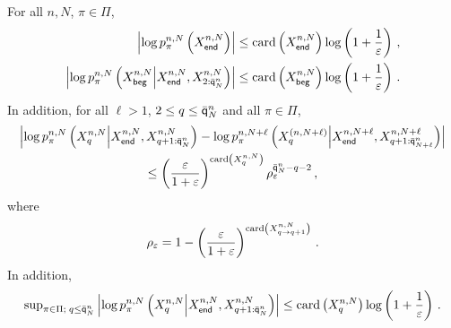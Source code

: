\begin{lemma}
\label{lem:exp:forget}
For all $n,N$, $\pi\in\Pi$,
\begin{align}
\left|\log p_{\pi}^{n,N}\left(X_{\mathsf{end}}^{n,N}\right)\right|&\le \mathrm{card}\left(X_{\mathsf{end}}^{n,N}\right)\log \left(1+\frac{1}{\varepsilon}\right)\,,\label{eq:bound:beg}\\
\left|\log p_{\pi}^{n,N}\left(X_{\mathsf{beg}}^{n,N}\middle|X_{\mathsf{end}}^{n,N},X_{2:\bar{\mathsf{q}}^{n}_{N}}^{n,N}\right)\right|&\le \mathrm{card}\left(X_{\mathsf{beg}}^{n,N}\right)\log \left(1+\frac{1}{\varepsilon}\right)\label{eq:bound:end}\,.
\end{align}
In addition,  for all $\ell>1$,  $2\le q\le \bar{\mathsf{q}}^{n}_{N}$ and all $\pi\in\Pi$,
\begin{multline}
\left|\log p_{\pi}^{n,N}\left(X_{q}^{n,N}\middle|X_{\mathsf{end}}^{n,N},X_{q+1:\bar{\mathsf{q}}^{n}_{N}}^{n,N}\right) - \log p_{\pi}^{n,N+\ell}\left(X_{q}^{(n,N+\ell)}\middle|X_{\mathsf{end}}^{n,N+\ell},X_{q+1:\bar{\mathsf{q}}^{n}_{N+\ell}}^{n,N+\ell}\right) \right|\\
\leq \left(\frac{\varepsilon}{1+\varepsilon}\right)^{\mathrm{card}\left(X^{n,N}_{q}\right)}\rho_{\varepsilon}^{\bar{\mathsf{q}}^{n}_{N}-q-2} \,,\label{eq:bound:forget}
\end{multline}
where
\begin{equation}
\label{eq:defrho}
\rho_{\varepsilon} = 1-\left(\frac{\varepsilon}{1+\varepsilon}\right)^{\mathrm{card}\left(X^{n,N}_{q\to q+1}\right)}\,.
\end{equation}
In addition,
\begin{equation}
\label{eq:bound:loglik}
\mathrm{sup}_{\pi\in\Pi;\;q\le \bar{\mathsf{q}}^{n}_{N}}\left|\log p_{\pi}^{n,N}\left(X_{q}^{n,N}\middle|X_{\mathsf{end}}^{n,N},X_{q+1:\bar{\mathsf{q}}^{n}_{N}}^{n,N}\right)\right|\le \mathrm{card}\left(X_{q}^{n,N}\right)\log \left(1+\frac{1}{\varepsilon}\right)\,. 
\end{equation}
\end{lemma}

